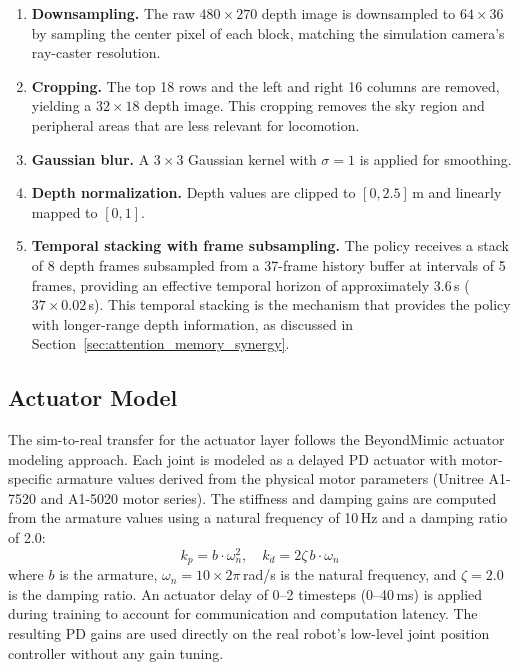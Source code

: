 \begin{enumerate}
    \item \textbf{Downsampling.} The raw $480 \times 270$ depth image is downsampled to $64 \times 36$ by sampling the center pixel of each block, matching the simulation camera's ray-caster resolution.
    \item \textbf{Cropping.} The top 18 rows and the left and right 16 columns are removed, yielding a $32 \times 18$ depth image. This cropping removes the sky region and peripheral areas that are less relevant for locomotion.
    \item \textbf{Gaussian blur.} A $3 \times 3$ Gaussian kernel with $\sigma = 1$ is applied for smoothing.
    \item \textbf{Depth normalization.} Depth values are clipped to $[0, 2.5]$\,m and linearly mapped to $[0, 1]$.
    \item \textbf{Temporal stacking with frame subsampling.} The policy receives a stack of 8 depth frames subsampled from a 37-frame history buffer at intervals of 5 frames, providing an effective temporal horizon of approximately 3.6\,s ($37 \times 0.02$\,s). This temporal stacking is the mechanism that provides the policy with longer-range depth information, as discussed in Section~\ref{sec:attention_memory_synergy}.
\end{enumerate}

\subsection{Actuator Model}
\label{sec:actuator_model}

The sim-to-real transfer for the actuator layer follows the BeyondMimic actuator modeling approach. Each joint is modeled as a delayed PD actuator with motor-specific armature values derived from the physical motor parameters (Unitree A1-7520 and A1-5020 motor series). The stiffness and damping gains are computed from the armature values using a natural frequency of 10\,Hz and a damping ratio of 2.0:
\begin{equation}
    k_p = b \cdot \omega_n^2, \quad k_d = 2\zeta \, b \cdot \omega_n
    \label{eq:actuator_gains}
\end{equation}
where $b$ is the armature, $\omega_n = 10 \times 2\pi$\,rad/s is the natural frequency, and $\zeta = 2.0$ is the damping ratio. An actuator delay of 0--2 timesteps (0--40\,ms) is applied during training to account for communication and computation latency. The resulting PD gains are used directly on the real robot's low-level joint position controller without any gain tuning.

